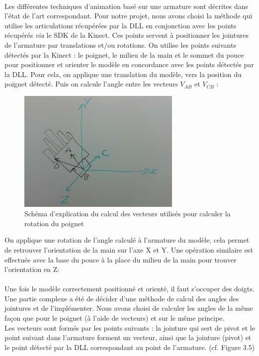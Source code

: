 \paragraph{}
Les différentes techniques d'animation basé sur une armature sont décrites dans l'état de l'art correspondant. 
Pour notre projet, nous avons choisi la méthode qui utilise les articulations récupérées par la DLL en conjonction avec les points récupérés \textit{via} le SDK de la Kinect. 
Ces points servent à positionner les jointures de l'armature par translations et/ou rotations.\newline
On utilise les points suivants détectés par la Kinect : le poignet, le milieu de la main et le sommet du pouce pour positionner et orienter le modèle en concordance avec les points détectés par la DLL.
Pour cela, on applique une translation du modèle, vers la position du poignet détecté. Puis on calcule l'angle entre les vecteurs $V_{AB}$ et $V_{CB}$  : 

\begin{figure}[H]
\centering
\includegraphics[width=0.7\textwidth]{images/SchemaRotationMain.jpg}
\caption{Schéma d'explication du calcul des vecteurs utilisés pour calculer la rotation du poignet}
\end{figure}

On applique une rotation de l'angle calculé à l'armature du modèle, cela permet de retrouver l'orientation de la main sur l'axe X et Y.
Une opération similaire est effectuée avec la base du pouce à la place du milieu de la main pour trouver l'orientation en Z: 

\paragraph{}
Une fois le modèle correctement positionné et orienté, il faut s'occuper des doigts. Une partie complexe a été de décider d'une méthode de calcul des angles des jointures et de l'implémenter.
Nous avons choisi de calculer les angles de la même façon que pour le poignet (à l'aide de vecteurs) et sur le même principe.\\
Les vecteurs sont formés par les points suivants : la jointure qui sert de pivot et le point suivant dans l'armature forment un vecteur, ainsi que la jointure (pivot) et le point détecté par la DLL correspondant au point de l'armature. (cf. Figure 3.5)

